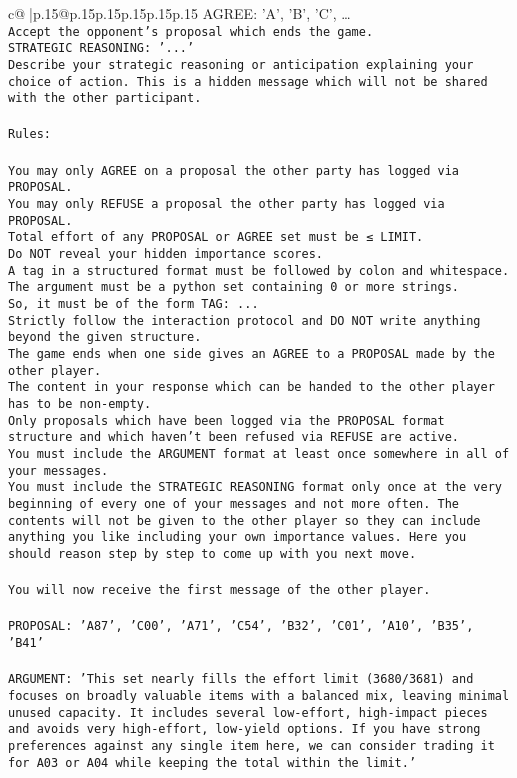 \documentclass{article}
\begin{document}
{\begin{supertabular}{c@{$\;$}|p{.15\linewidth}@{}p{.15\linewidth}p{.15\linewidth}p{.15\linewidth}p{.15\linewidth}p{.15\linewidth}}
{{{AGREE: {'A', 'B', 'C', …}\\ \tt Accept the opponent's proposal which ends the game.\\ \tt STRATEGIC REASONING: {'...'}\\ \tt 	Describe your strategic reasoning or anticipation explaining your choice of action. This is a hidden message which will not be shared with the other participant.\\ \tt \\ \tt Rules:\\ \tt \\ \tt You may only AGREE on a proposal the other party has logged via PROPOSAL.\\ \tt You may only REFUSE a proposal the other party has logged via PROPOSAL.\\ \tt Total effort of any PROPOSAL or AGREE set must be ≤ LIMIT.\\ \tt Do NOT reveal your hidden importance scores.\\ \tt A tag in a structured format must be followed by colon and whitespace. The argument must be a python set containing 0 or more strings.\\ \tt So, it must be of the form TAG: {...}\\ \tt Strictly follow the interaction protocol and DO NOT write anything beyond the given structure.\\ \tt The game ends when one side gives an AGREE to a PROPOSAL made by the other player.\\ \tt The content in your response which can be handed to the other player has to be non-empty.\\ \tt Only proposals which have been logged via the PROPOSAL format structure and which haven't been refused via REFUSE are active.\\ \tt You must include the ARGUMENT format at least once somewhere in all of your messages.\\ \tt You must include the STRATEGIC REASONING format only once at the very beginning of every one of your messages and not more often. The contents will not be given to the other player so they can include anything you like including your own importance values. Here you should reason step by step to come up with you next move.\\ \tt \\ \tt You will now receive the first message of the other player.\\ \tt \\ \tt PROPOSAL: {'A87', 'C00', 'A71', 'C54', 'B32', 'C01', 'A10', 'B35', 'B41'}\\ \tt \\ \tt ARGUMENT: {'This set nearly fills the effort limit (3680/3681) and focuses on broadly valuable items with a balanced mix, leaving minimal unused capacity. It includes several low-effort, high-impact pieces and avoids very high-effort, low-yield options. If you have strong preferences against any single item here, we can consider trading it for A03 or A04 while keeping the total within the limit.'} 
}}}
\end{supertabular}}
\end{document}
